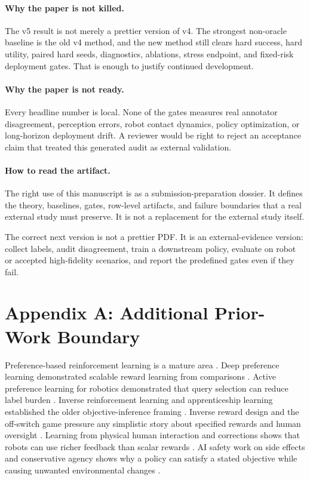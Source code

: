 \documentclass{article}
\begin{document}
\paragraph{Why the paper is not killed.}
The v5 result is not merely a prettier version of v4. The strongest non-oracle baseline is the old v4 method, and the new method still clears hard success, hard utility, paired hard seeds, diagnostics, ablations, stress endpoint, and fixed-risk deployment gates. That is enough to justify continued development.

\paragraph{Why the paper is not ready.}
Every headline number is local. None of the gates measures real annotator disagreement, perception errors, robot contact dynamics, policy optimization, or long-horizon deployment drift. A reviewer would be right to reject an acceptance claim that treated this generated audit as external validation.

\paragraph{How to read the artifact.}
The right use of this manuscript is as a submission-preparation dossier. It defines the theory, baselines, gates, row-level artifacts, and failure boundaries that a real external study must preserve. It is not a replacement for the external study itself.

The correct next version is not a prettier PDF. It is an external-evidence version: collect labels, audit disagreement, train a downstream policy, evaluate on robot or accepted high-fidelity scenarios, and report the predefined gates even if they fail.

\clearpage
\section*{Appendix A: Additional Prior-Work Boundary}
Preference-based reinforcement learning is a mature area \citep{wirth2017survey}. Deep preference learning demonstrated scalable reward learning from comparisons \citep{christiano2017deep}. Active preference learning for robotics demonstrated that query selection can reduce label burden \citep{sadigh2017active}. Inverse reinforcement learning and apprenticeship learning established the older objective-inference framing \citep{ng2000algorithms,abbeel2004apprenticeship}. Inverse reward design and the off-switch game pressure any simplistic story about specified rewards and human oversight \citep{hadfieldmenell2017inverse,hadfieldmenell2017off}. Learning from physical human interaction and corrections shows that robots can use richer feedback than scalar rewards \citep{bajcsy2017learning,bobu2020quantifying,losey2020learning}. AI safety work on side effects and conservative agency shows why a policy can satisfy a stated objective while causing unwanted environmental changes \citep{amodei2016concrete,leike2017ai,krakovna2018measuring,turner2020conservative}.
\end{document}
